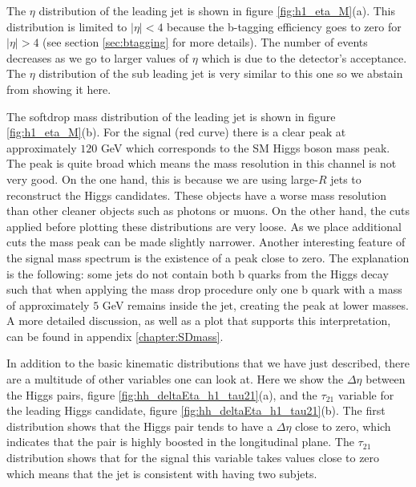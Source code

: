 The $\eta$ distribution of the leading jet is shown in figure \ref{fig:h1_eta_M}(a). This distribution is limited to $|\eta|<4$ because the b-tagging efficiency goes to zero for $|\eta|>4$ (see section \ref{sec:btagging} for more details). The number of events decreases as we go to larger values of $\eta$ which is due to the detector's acceptance. The $\eta$ distribution of the sub leading jet is very similar to this one so we abstain from showing it here.

The softdrop mass distribution of the leading jet is shown in figure \ref{fig:h1_eta_M}(b). For the signal (red curve) there is a clear peak at approximately $120$ GeV which corresponds to the SM Higgs boson mass peak. The peak is quite broad which means the mass resolution in this channel is not very good. On the one hand, this is because we are using large-$R$ jets to reconstruct the Higgs candidates. These objects have a worse mass resolution than other cleaner objects such as photons or muons.  On the other hand, the cuts applied before plotting these distributions are very loose. As we place additional cuts the mass peak can be made slightly narrower. Another interesting feature of the signal mass spectrum is the existence of a peak close to zero. The explanation is the following: some jets do not contain both b quarks from the Higgs decay such that when applying the mass drop procedure only one b quark with a mass of approximately $5$ GeV remains inside the jet, creating the peak at lower masses. A more detailed discussion, as well as a plot that supports this interpretation, can be found in appendix \ref{chapter:SDmass}.

In addition to the basic kinematic distributions that we have just described, there are a multitude of other variables one can look at. Here we show the $\Delta\eta$ between the Higgs pairs, figure \ref{fig:hh_deltaEta_h1_tau21}(a), and the $\tau_{21}$ variable for the leading Higgs candidate, figure \ref{fig:hh_deltaEta_h1_tau21}(b). The first distribution shows that the Higgs pair tends to have a $\Delta\eta$ close to zero, which indicates that the pair is highly boosted in the longitudinal plane. The $\tau_{21}$ distribution shows that for the signal this variable takes values close to zero which means that the jet is consistent with having two subjets.

